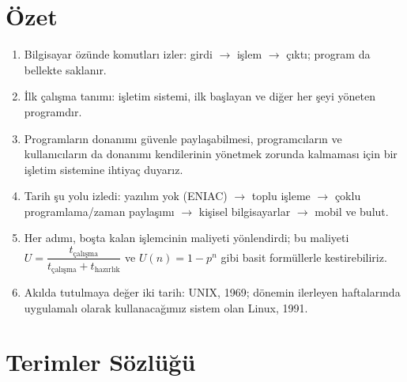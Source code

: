 \documentclass[11pt,a4paper]{article}
\begin{document}
\section{Özet}

\begin{keyidea}
\begin{enumerate}[leftmargin=1.4em]
  \item Bilgisayar özünde komutları izler: girdi $\to$ işlem $\to$ çıktı; program da bellekte saklanır.
  \item İlk çalışma tanımı: işletim sistemi, ilk başlayan ve diğer her şeyi yöneten programdır.
  \item Programların donanımı güvenle paylaşabilmesi, programcıların ve kullanıcıların da donanımı kendilerinin yönetmek zorunda kalmaması için bir işletim sistemine ihtiyaç duyarız.
  \item Tarih şu yolu izledi: yazılım yok (ENIAC) $\to$ toplu işleme $\to$ çoklu programlama/zaman paylaşımı $\to$ kişisel bilgisayarlar $\to$ mobil ve bulut.
  \item Her adımı, boşta kalan işlemcinin maliyeti yönlendirdi; bu maliyeti $U = \dfrac{t_{\text{çalışma}}}{t_{\text{çalışma}}+t_{\text{hazırlık}}}$ ve $U(n) = 1 - p^{n}$ gibi basit formüllerle kestirebiliriz.
  \item Akılda tutulmaya değer iki tarih: UNIX, 1969; dönemin ilerleyen haftalarında uygulamalı olarak kullanacağımız sistem olan Linux, 1991.
\end{enumerate}
\end{keyidea}

\section{Terimler Sözlüğü}
\end{document}
